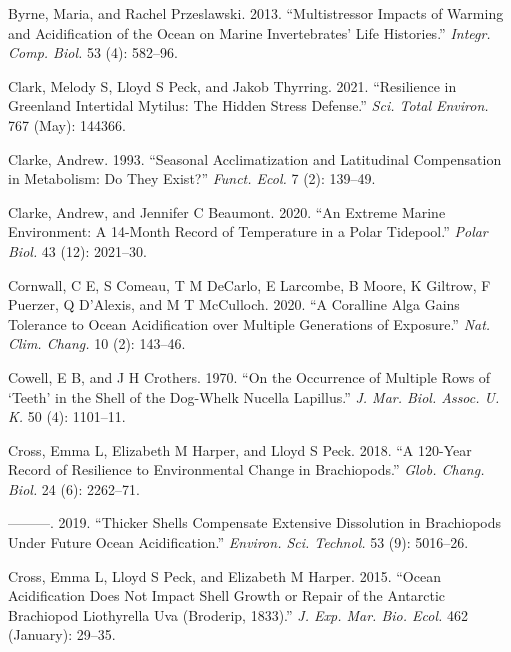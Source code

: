 \documentclass[smallextended]{svjour3}       %
\newlength{\cslhangindent}
\newenvironment{CSLReferences}[2] %
 {%
  \setlength{\parindent}{0pt}
  \ifodd #1 \everypar{\setlength{\hangindent}{\cslhangindent}}\ignorespaces\fi
  \ifnum #2 > 0
  \setlength{\parskip}{#2\baselineskip}
  \fi
 }%
 {}
\begin{document}
\begin{CSLReferences}{1}{0}
\leavevmode{}%
Byrne, Maria, and Rachel Przeslawski. 2013. {``Multistressor Impacts of
Warming and Acidification of the Ocean on Marine Invertebrates' Life
Histories.''} \emph{Integr. Comp. Biol.} 53 (4): 582--96.

\leavevmode{}%
Clark, Melody S, Lloyd S Peck, and Jakob Thyrring. 2021. {``Resilience
in Greenland Intertidal Mytilus: The Hidden Stress Defense.''}
\emph{Sci. Total Environ.} 767 (May): 144366.

\leavevmode{}%
Clarke, Andrew. 1993. {``Seasonal Acclimatization and Latitudinal
Compensation in Metabolism: Do They Exist?''} \emph{Funct. Ecol.} 7 (2):
139--49.

\leavevmode{}%
Clarke, Andrew, and Jennifer C Beaumont. 2020. {``An Extreme Marine
Environment: A 14-Month Record of Temperature in a Polar Tidepool.''}
\emph{Polar Biol.} 43 (12): 2021--30.

\leavevmode{}%
Cornwall, C E, S Comeau, T M DeCarlo, E Larcombe, B Moore, K Giltrow, F
Puerzer, Q D'Alexis, and M T McCulloch. 2020. {``A Coralline Alga Gains
Tolerance to Ocean Acidification over Multiple Generations of
Exposure.''} \emph{Nat. Clim. Chang.} 10 (2): 143--46.

\leavevmode{}%
Cowell, E B, and J H Crothers. 1970. {``On the Occurrence of Multiple
Rows of {`Teeth'} in the Shell of the {Dog-Whelk} Nucella Lapillus.''}
\emph{J. Mar. Biol. Assoc. U. K.} 50 (4): 1101--11.

\leavevmode{}%
Cross, Emma L, Elizabeth M Harper, and Lloyd S Peck. 2018. {``A 120-Year
Record of Resilience to Environmental Change in Brachiopods.''}
\emph{Glob. Chang. Biol.} 24 (6): 2262--71.

\leavevmode{}%
---------. 2019. {``Thicker Shells Compensate Extensive Dissolution in
Brachiopods Under Future Ocean Acidification.''} \emph{Environ. Sci.
Technol.} 53 (9): 5016--26.

\leavevmode{}%
Cross, Emma L, Lloyd S Peck, and Elizabeth M Harper. 2015. {``Ocean
Acidification Does Not Impact Shell Growth or Repair of the Antarctic
Brachiopod Liothyrella Uva (Broderip, 1833).''} \emph{J. Exp. Mar. Bio.
Ecol.} 462 (January): 29--35.


\end{CSLReferences}
\end{document}

